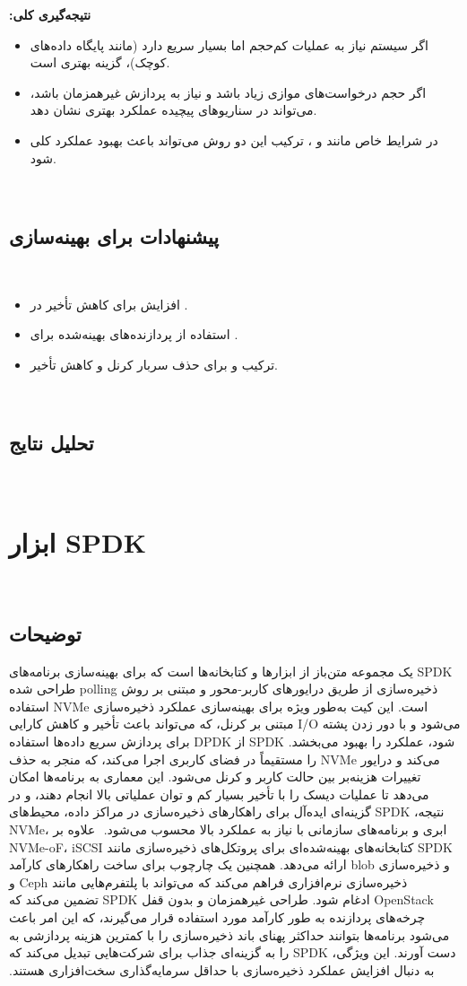 ‫
‫\textbf{نتیجه‌گیری کلی:}
‫\begin{itemize}
‫	\item اگر سیستم نیاز به عملیات  کم‌حجم اما بسیار سریع دارد (مانند پایگاه داده‌های کوچک)،  گزینه بهتری است.
‫	\item اگر حجم درخواست‌های موازی زیاد باشد و نیاز به پردازش غیرهمزمان باشد،  می‌تواند در سناریوهای پیچیده عملکرد بهتری نشان دهد.
‫	\item در شرایط خاص مانند  و ، ترکیب این دو روش می‌تواند باعث بهبود عملکرد کلی شود.
‫\end{itemize}
‫
‫\subsection*{پیشنهادات برای بهینه‌سازی}
‫\begin{itemize}
‫	\item افزایش  برای کاهش تأخیر در .
‫	\item استفاده از پردازنده‌های بهینه‌شده برای .
‫	\item ترکیب  و  برای حذف سربار کرنل و کاهش تأخیر.
‫\end{itemize}
‫
‫‫\subsection*{تحلیل نتایج}
‫
‫‫\section{ابزار SPDK}
‫
‫‫\subsection*{توضیحات}
‫
‫SPDK یک مجموعه متن‌باز از ابزارها و کتابخانه‌ها است که برای بهینه‌سازی برنامه‌های ذخیره‌سازی از طریق درایورهای کاربر-محور و مبتنی بر روش polling طراحی شده است. این کیت به‌طور ویژه برای بهینه‌سازی عملکرد ذخیره‌سازی NVMe استفاده می‌شود و با دور زدن پشته I/O مبتنی بر کرنل، که می‌تواند باعث تأخیر و کاهش کارایی شود، عملکرد را بهبود می‌بخشد. SPDK از DPDK برای پردازش سریع داده‌ها استفاده می‌کند و درایور NVMe را مستقیماً در فضای کاربری اجرا می‌کند، که منجر به حذف تغییرات هزینه‌بر بین حالت کاربر و کرنل می‌شود. این معماری به برنامه‌ها امکان می‌دهد تا عملیات دیسک را با تأخیر بسیار کم و توان عملیاتی بالا انجام دهند، و در نتیجه، SPDK گزینه‌ای ایده‌آل برای راهکارهای ذخیره‌سازی در مراکز داده، محیط‌های ابری و برنامه‌های سازمانی با نیاز به عملکرد بالا محسوب می‌شود.
‫
‫علاوه بر NVMe، SPDK کتابخانه‌های بهینه‌شده‌ای برای پروتکل‌های ذخیره‌سازی مانند   NVMe-oF، iSCSI و ذخیره‌سازی blob ارائه می‌دهد. همچنین یک چارچوب برای ساخت راهکارهای کارآمد ذخیره‌سازی نرم‌افزاری فراهم می‌کند که می‌تواند با پلتفرم‌هایی مانند Ceph و OpenStack ادغام شود. طراحی غیرهمزمان و بدون قفل SPDK تضمین می‌کند که چرخه‌های پردازنده به طور کارآمد مورد استفاده قرار می‌گیرند، که این امر باعث می‌شود برنامه‌ها بتوانند حداکثر پهنای باند ذخیره‌سازی را با کمترین هزینه پردازشی به دست آورند. این ویژگی، SPDK را به گزینه‌ای جذاب برای شرکت‌هایی تبدیل می‌کند که به دنبال افزایش عملکرد ذخیره‌سازی با حداقل سرمایه‌گذاری سخت‌افزاری هستند.
